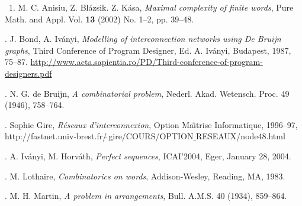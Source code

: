 \documentclass[10pt]{article}
\begin{document}
\quad\ 1. M. C. Anisiu, Z. Bl\'azsik. Z. K\'asa, \textit{Maximal complexity of finite words}, 
Pure Math. and Appl. Vol. \textbf{13} (2002) No. 1--2, pp. 39--48.

. J. Bond, A. Iv\'anyi,  \textit{Modelling of interconnection
networks using De Bruijn graphs}, Third Conference of Program Designer, 
Ed. A. Iv\'anyi, Budapest, 1987,  75--87. 
{\scriptsize \url{http://www.acta.sapientia.ro/PD/Third-conference-of-program-designers.pdf}}

. N. G. de Bruijn, \textit{A combinatorial problem}, 
Nederl. Akad. Wetensch. Proc. 49 (1946), 758--764.

. Sophie Gire, 
\emph{R\'eseaux d'interconnexion},  Option Ma\^{\i}trise Informatique, 1996--97,
{\scriptsize {http://fastnet.univ-brest.fr/$\tilde{\ }$gire/COURS/OPTION$\_$RESEAUX/node48.html}}

. A. Iv\'anyi, M. Horv\'ath, \textit{Perfect sequences}, ICAI'2004, Eger, January 28, 2004.

. M. Lothaire, \textit{Combinatorics on words}, 
Addison-Wesley, Reading, MA, 1983.

. M. H. Martin, \textit{A problem in arrangements}, 
Bull. A.M.S. 40 (1934), 859--864.
\end{document}
